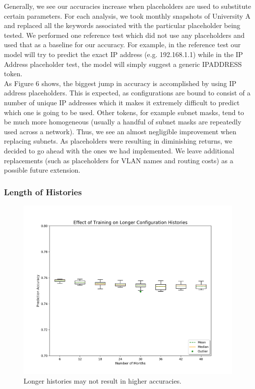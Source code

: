 Generally, we see our accuracies increase when placeholders are used to substitute certain parameters. For each analysis, we took monthly snapshots of University A and replaced all the keywords associated with the particular placeholder being tested. We performed one reference test which did not use any placeholders and used that as a baseline for our accuracy. For example, in the reference test our model will try to predict the exact IP address (e.g. 192.168.1.1) while in the IP Address placeholder test, the model will simply suggest a generic IPADDRESS token.\\

 As Figure 6 shows, the biggest jump in accuracy is accomplished by using IP address placeholders. This is expected, as configurations are bound to consist of a number of unique IP addresses which it makes it extremely difficult to predict which one is going to be used. Other tokens, for example subnet masks, tend to be much more homogeneous (usually a handful of subnet masks are repeatedly used across a network). Thus, we see an almost negligible improvement when replacing subnets. As placeholders were resulting in diminishing returns, we decided to go ahead with the ones we had implemented. We leave additional replacements (such as placeholders for VLAN names and routing costs) as a possible future extension.

\subsubsection{Length of Histories}

\begin{figure}[H]
	\centering
	\includegraphics[width=\textwidth]{time.png}
	\caption{Longer histories may not result in higher accuracies.}
\end{figure}

